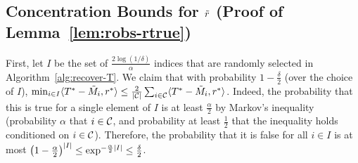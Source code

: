 \subsection{Concentration Bounds for $\tilde{r}$ (Proof of Lemma~\ref{lem:robs-rtrue})}
\label{sec:concentration-proof}

First, let $I$ be the set of $\frac{2\log(1/\delta)}{\alpha}$ 
indices that are randomly selected in Algorithm~\ref{alg:recover-T}. 
We claim that with probability $1-\frac{\delta}{2}$ (over the choice of $I$), 
$\min_{i \in I} \langle T^* - \tilde{M}_i, r^* \rangle \leq \frac{2}{|\mathcal{C}|} \sum_{i \in \mathcal{C}} \langle T^* - \tilde{M}_i, r^* \rangle$.
Indeed, the probability that this is true for a single element of 
$I$ is at least $\frac{\alpha}{2}$ by Markov's inequality (probability $\alpha$ that $i \in \mathcal{C}$, 
and probability at least $\frac{1}{2}$ that the inequality holds conditioned on $i \in \mathcal{C}$). 
Therefore, the probability that it is false for all $i \in I$ is at most 
$\left( 1 - \frac{\alpha}{2} \right)^{|I|} \leq \exp^{-\frac{\alpha}{2}|I|} \leq \frac{\delta}{2}$.

